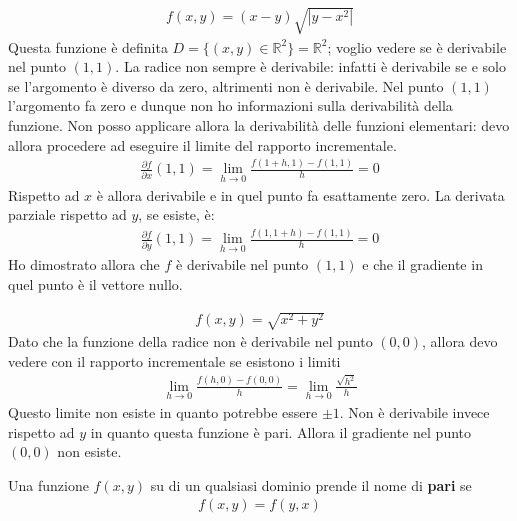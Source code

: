 \documentclass[a4paper, oneside]{book}
\begin{document}
\begin{example}
    \begin{gather*}
        f(x, y) = (x - y)\sqrt{|y - x^{2}| } 
    \end{gather*}
    Questa funzione è definita $D = \{(x, y) \in \mathbb{R}^{2} \} = \mathbb{R}^{2}$; voglio
    vedere se è derivabile nel punto $(1, 1)$. La radice non sempre è
    derivabile: infatti è derivabile se e solo se l'argomento è 
    diverso da zero, altrimenti non è derivabile. Nel punto 
    $(1, 1)$ l'argomento fa zero e dunque non ho informazioni sulla derivabilità
    della funzione. Non posso applicare allora la derivabilità delle funzioni
    elementari: devo allora procedere ad eseguire il limite
    del rapporto incrementale. 
    \begin{gather*}
        \frac{\partial f}{\partial x}(1, 1) = \lim_{h \to 0} \frac{f(1 + h, 1) - f(1, 1)}{h} = 0
    \end{gather*} 
    Rispetto ad $x$ è allora derivabile e in quel punto fa esattamente zero. La derivata
    parziale rispetto ad $y$, se esiste, è:
    \begin{gather*}
        \frac{\partial f}{\partial y}(1, 1) = \lim_{h \to 0} \frac{f(1, 1 + h) - f(1, 1)}{h} = 0  
    \end{gather*}
    Ho dimostrato allora che $f$ è derivabile nel punto $(1, 1)$ e che il
    gradiente in quel punto è il vettore nullo. 
\end{example}

\begin{example}
    \begin{gather*}
        f(x, y) = \sqrt{x^{2} + y^{2}  } 
    \end{gather*}
    Dato che la funzione della radice non è derivabile nel punto $(0, 0)$, allora
    devo vedere con il rapporto incrementale se esistono i limiti
    \begin{gather*}
        \lim_{h \to 0} \frac{f(h, 0) - f(0, 0)}{h} = \lim_{h \to 0} \frac{\sqrt{h^{2} } }{h}   
    \end{gather*}
    Questo limite non esiste in quanto potrebbe essere $\pm 1$. Non è derivabile
    invece rispetto ad $y$ in quanto questa funzione è pari. Allora il gradiente nel
    punto $(0, 0)$ non esiste. 
\end{example}

\begin{definition}
    Una funzione $f(x, y)$ su di un qualsiasi dominio 
    prende il nome di \textbf{pari} se  
    \begin{align}
        f(x, y) = f(y, x)
    \end{align} 
\end{definition}
\end{document}

